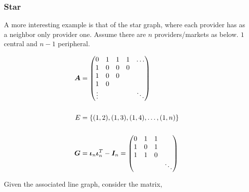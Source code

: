 \subsubsection{Star}

A more interesting example is that of the star graph, where each provider has as a neighbor only provider one. Assume there are $n$ providers/markets as below. $1$ central and $n-1$ peripheral.

\vspace{5mm}
\begin{minipage}{.5\textwidth}
    \resizebox{\textwidth}{!}{}
\end{minipage}
\begin{minipage}{.5\textwidth}
    \begin{equation*}
        \begin{split}
            \matr{A} &= \begin{pmatrix}
                0      & 1 & 1 & 1 & \ldots \\
                1      & 0 & 0 & 0 &        \\
                1      & 0 & 0 &   &        \\
                1      & 0 &   &   &        \\
                \vdots &   &   &   & \ddots
            \end{pmatrix} \\
            \vspace{5mm} \\
            E &= \set{(1, 2), (1, 3), (1, 4), \ldots, (1, n)} \\
            \vspace{5mm} \\
            \G &= \matr{\iota}_n \matr{\iota}_n^T - \I_n =  \begin{pmatrix}
                0 & 1 & 1 &        \\
                1 & 0 & 1 &        \\
                1 & 1 & 0 &        \\
                  &   &   & \ddots
            \end{pmatrix}
        \end{split}
    \end{equation*}
\end{minipage}
\vspace{5mm}

Given the associated line graph, consider the matrix,

